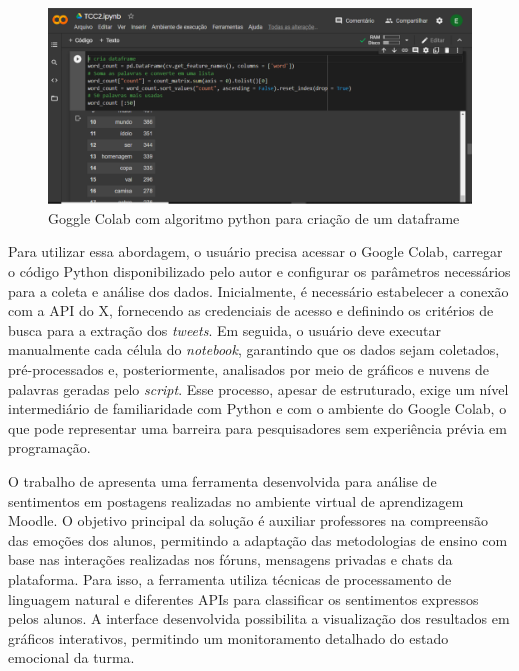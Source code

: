 \documentclass[
	12pt,				%
	oneside,			%
	a4paper,			%
	english,			%
	french,				%
	spanish,			%
	brazil				%
	]{abntex2}
\begin{document}
\begin{figure}[htbp]
\hypertarget{google_colab}{%
\caption{Goggle Colab com algoritmo python para criação de um dataframe}\label{google_colab}
\begin{center}
\includegraphics[scale=0.3]{imagens/google_colab.png}
\end{center}
}
\end{figure}

Para utilizar essa abordagem, o usuário precisa acessar o Google Colab,
carregar o código Python disponibilizado pelo autor e configurar os
parâmetros necessários para a coleta e análise dos dados. Inicialmente,
é necessário estabelecer a conexão com a API do X, fornecendo as
credenciais de acesso e definindo os critérios de busca para a extração
dos \emph{tweets}. Em seguida, o usuário deve executar manualmente cada
célula do \emph{notebook}, garantindo que os dados sejam coletados,
pré-processados e, posteriormente, analisados por meio de gráficos e
nuvens de palavras geradas pelo \emph{script}. Esse processo, apesar de
estruturado, exige um nível intermediário de familiaridade com Python e
com o ambiente do Google Colab, o que pode representar uma barreira para
pesquisadores sem experiência prévia em programação.

O trabalho de  apresenta uma ferramenta
desenvolvida para análise de sentimentos em postagens realizadas no
ambiente virtual de aprendizagem Moodle. O objetivo principal da solução
é auxiliar professores na compreensão das emoções dos alunos, permitindo
a adaptação das metodologias de ensino com base nas interações
realizadas nos fóruns, mensagens privadas e chats da plataforma. Para
isso, a ferramenta utiliza técnicas de processamento de linguagem
natural e diferentes APIs para classificar os sentimentos expressos
pelos alunos. A interface desenvolvida possibilita a visualização dos
resultados em gráficos interativos, permitindo um monitoramento
detalhado do estado emocional da turma.
\end{document}
